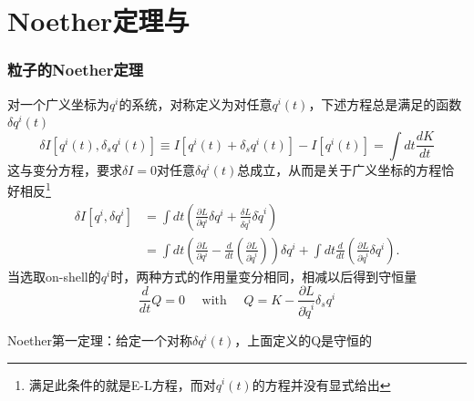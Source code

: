 \documentclass[10pt,openany]{book}
\theoremstyle{thmstyle} %
\theoremstyle{defstyle} %
\theoremstyle{prostyle} %
\begin{document}
\section{Noether定理与}
\subsubsection{粒子的Noether定理}
对一个广义坐标为$ q^i $的系统，对称定义为对任意$ q^i(t) $，下述方程总是满足的函数$ \delta q^i(t) $
\begin{equation}
  \delta I\left[q^i(t), \delta_s q^i(t)\right] \equiv I\left[q^i(t)+\delta_s q^i(t)\right]-I\left[q^i(t)\right]=\int d t \frac{d K}{d t}
\end{equation}
这与变分方程，要求$\delta I=0$对任意$ \delta q^i(t) $总成立，从而是关于广义坐标的方程恰好相反\footnote{满足此条件的就是E-L方程，而对$ q^i(t) $的方程并没有显式给出}
\begin{equation}
  \begin{aligned}
    \delta I\left[q^i, \delta q^i\right] & =\int d t\left(\frac{\partial L}{\partial q^i} \delta q^i+\frac{\delta L}{\delta \dot{q}^i} \delta \dot{q}^i\right) \\
    & =\int d t\left(\frac{\partial L}{\partial q^i}-\frac{d}{d t}\left(\frac{\partial L}{\partial \dot{q}^i}\right)\right) \delta q^i+\int d t \frac{d}{d t}\left(\frac{\partial L}{\partial \dot{q}^i} \delta q^i\right) .
    \end{aligned}
\end{equation}
当选取on-shell的$ q^i $时，两种方式的作用量变分相同，相减以后得到守恒量
\begin{equation}
  \frac{d}{d t} Q=0 \quad \text { with } \quad Q=K-\frac{\partial L}{\partial \dot{q}^i} \delta_s q^i
\end{equation}
\begin{center}
Noether第一定理：给定一个对称$ \delta q^i(t) $，上面定义的Q是守恒的
\end{center}
\end{document}
